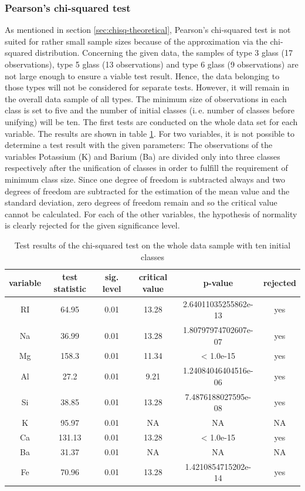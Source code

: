 \documentclass[a4paper, 12pt, titlepage, headsepline, listof = totoc, bibliography = totoc, numbers = noenddot]{scrartcl}
\newcommand{\ie}{i.\,e. }
\begin{document}
\subsubsection{Pearson's chi-squared test}

As mentioned in section \ref{sec:chisq-theoretical}, Pearson's chi-squared test is not suited for rather small sample sizes because of the approximation via the chi-squared distribution. Concerning the given data, the samples of type 3 glass (17 observations), type 5 glass (13 observations) and type 6 glass (9 observations) are not large enough to ensure a viable test result. Hence, the data belonging to those types will not be considered for separate tests. However, it will remain in the overall data sample of all types. The minimum size of observations in each class is set to five and the number of initial classes (\ie number of classes before unifying) will be ten. The first tests are conducted on the whole data set for each variable. The results are shown in table \ref{tab:chi-full}. For two variables, it is not possible to determine a test result with the given parameters: The observations of the variables Potassium (K) and Barium (Ba) are divided only into three classes respectively after the unification of classes in order to fulfill the requirement of minimum class size. Since one degree of freedom is subtracted always and two degrees of freedom are subtracted for the estimation of the mean value and the standard deviation, zero degrees of freedom remain and so the critical value cannot be calculated. For each of the other variables, the hypothesis of normality is clearly rejected for the given significance level.

\begin{table}[h!]
\centering
\begin{tabular}{|cccccc|} \hline variable & test statistic & sig. level & critical value & p-value & rejected\\ \hline RI & 64.95 & 0.01 & 13.28 & 2.64011035255862e-13 & yes\\ 
Na & 36.99 & 0.01 & 13.28 & 1.80797974702607e-07 & yes\\ 
Mg & 158.3 & 0.01 & 11.34 & < 1.0e-15 & yes\\ 
Al & 27.2 & 0.01 & 9.21 & 1.24084046404516e-06 & yes\\ 
Si & 38.85 & 0.01 & 13.28 & 7.4876188027595e-08 & yes\\ 
K & 95.97 & 0.01 & NA & NA & NA\\ 
Ca & 131.13 & 0.01 & 13.28 & < 1.0e-15 & yes\\ 
Ba & 31.37 & 0.01 & NA & NA & NA\\ 
Fe & 70.96 & 0.01 & 13.28 & 1.4210854715202e-14 & yes\\ \hline \end{tabular}\caption{Test results of the chi-squared test on the whole data sample with ten initial classes}
\label{tab:chi-full}
\end{table}
\end{document}

